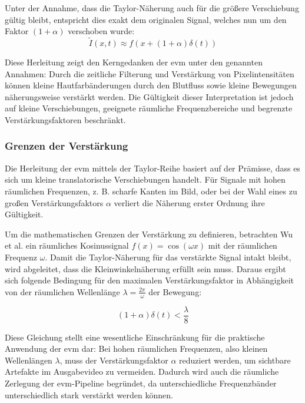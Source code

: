 Unter der Annahme, dass die Taylor-Näherung auch für die größere Verschiebung gültig bleibt, entspricht dies exakt dem originalen Signal, welches nun um den Faktor $(1 + \alpha)$ verschoben wurde:
\begin{equation}
\tilde{I}(x, t) \approx f(x + (1 + \alpha)\delta(t))
\end{equation}

Diese Herleitung zeigt den Kerngedanken der \ac{evm} unter den genannten Annahmen: Durch die zeitliche Filterung und Verstärkung von Pixelintensitäten können kleine Hautfarbänderungen durch den Blutfluss sowie kleine Bewegungen näherungsweise verstärkt werden. Die Gültigkeit dieser Interpretation ist jedoch auf kleine Verschiebungen, geeignete räumliche Frequenzbereiche und begrenzte Verstärkungsfaktoren beschränkt.

\subsubsection{Grenzen der Verstärkung}

Die Herleitung der \ac{evm} mittels der Taylor-Reihe basiert auf der Prämisse, dass es sich um kleine translatorische Verschiebungen handelt. Für Signale mit hohen räumlichen Frequenzen, z. B. scharfe Kanten im Bild, oder bei der Wahl eines zu großen Verstärkungsfaktors $\alpha$ verliert die Näherung erster Ordnung ihre Gültigkeit.

Um die mathematischen Grenzen der Verstärkung zu definieren, betrachten Wu et al. ein räumliches Kosinussignal $f(x) = \cos(\omega x)$ mit der räumlichen Frequenz $\omega$. Damit die Taylor-Näherung für das verstärkte Signal intakt bleibt, wird abgeleitet, dass die Kleinwinkelnäherung erfüllt sein muss. Daraus ergibt sich folgende Bedingung für den maximalen Verstärkungsfaktor in Abhängigkeit von der räumlichen Wellenlänge $\lambda = \frac{2\pi}{\omega}$ der Bewegung:

\begin{equation}
(1 + \alpha)\delta(t) < \frac{\lambda}{8}
\end{equation}

Diese Gleichung stellt eine wesentliche Einschränkung für die praktische Anwendung der \ac{evm} dar: Bei hohen räumlichen Frequenzen, also kleinen Wellenlängen $\lambda$, muss der Verstärkungsfaktor $\alpha$ reduziert werden, um sichtbare Artefakte im Ausgabevideo zu vermeiden. Dadurch wird auch die räumliche Zerlegung der \ac{evm}-Pipeline begründet, da unterschiedliche Frequenzbänder unterschiedlich stark verstärkt werden können.

